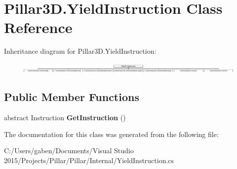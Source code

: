 \hypertarget{class_pillar3_d_1_1_yield_instruction}{}\section{Pillar3\+D.\+Yield\+Instruction Class Reference}
\label{class_pillar3_d_1_1_yield_instruction}
Inheritance diagram for Pillar3\+D.\+Yield\+Instruction\+:\begin{figure}[H]
\begin{center}
\leavevmode
\includegraphics[height=0.536913cm]{class_pillar3_d_1_1_yield_instruction}
\end{center}
\end{figure}
\subsection*{Public Member Functions}
\begin{DoxyCompactItemize}
\item 
\mbox{\label{class_pillar3_d_1_1_yield_instruction_a26be5cef50ef706eaa195af4aa36973e}} 
abstract Instruction {\bfseries Get\+Instruction} ()
\end{DoxyCompactItemize}


The documentation for this class was generated from the following file\+:\begin{DoxyCompactItemize}
\item 
C\+:/\+Users/gaben/\+Documents/\+Visual Studio 2015/\+Projects/\+Pillar/\+Pillar/\+Internal/Yield\+Instruction.\+cs\end{DoxyCompactItemize}
